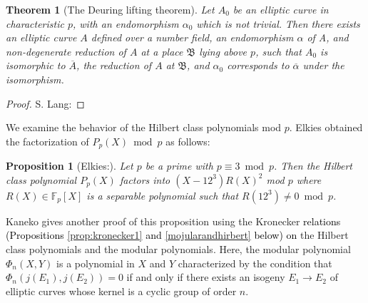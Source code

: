 \documentclass[a4paper, 11pt]{article}
\theoremstyle{plain}
\newtheorem{thm}[defn]{Theorem}
\newtheorem{prop}[defn]{Proposition}
\newcommand{\?}{\textcolor{red}{??}}
\newcommand{\fp}{\mathbb{F}_p}
\begin{document}
\begin{thm}[The Deuring lifting theorem]
\label{deuring}
    Let $A_0$ be an elliptic curve in characteristic $p$, with an endomorphism $\alpha_0$ which is not trivial. Then there exists an elliptic curve $A$ defined over a number field, an endomorphism $\alpha$ of A, and non-degenerate reduction of $A$ at a place $\mathfrak{B}$ lying above $p$, such that $A_0$ is isomorphic to $\overline{A}$, the reduction of $A$ at $\mathfrak{B}$, and $\alpha_0$ corresponds to $\overline{\alpha}$ under the isomorphism.  
\end{thm}
\begin{proof}
    S. Lang:\cite[Chapter 13, Theorem 14]{SL}
\end{proof}
 We examine the behavior of the Hilbert class polynomials mod $p$. Elkies obtained the factorization of $P_p(X) \bmod p$ as follows:

\begin{prop}[{Elkies:\cite{Elkies}}]
\label{fac_P_p}
Let $p$ be a prime with $p \equiv3 \bmod p$. Then the Hilbert class polynomial $P_p(X)$ factors into $(X-12^3)R(X)^2$ mod $p$ where $R(X)\in\fp[X]$ is a separable polynomial such that $R(12^3)\ne0 \bmod p$.
\end{prop}
Kaneko \cite[Appendix]{kaneko} gives another proof of this proposition using the Kronecker \textcolor{black}{relations (Propositions \ref{prop:kronecker1} and \ref{mojularandhirbert} below) on} the Hilbert class polynomials and the modular polynomials. Here, the modular polynomial $\Phi_n(X,Y)$ is a polynomial in $X$ and $Y$ characterized by
the condition that $\Phi_n(j(E_1),j(E_2))=0$
if and only if there exists an isogeny $E_1 \to E_2$
of elliptic curves whose kernel is a cyclic group of order $n$.
\end{document}
